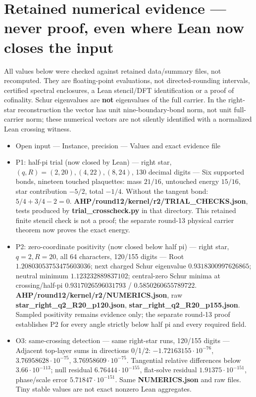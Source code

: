 \section{Retained numerical evidence — never proof, even where Lean now closes the input}

All values below were checked against retained data/summary files, not recomputed. They are floating-point evaluations, not directed-rounding intervals, certified spectral enclosures, a Lean stencil/DFT identification or a proof of cofinality. Schur eigenvalues are \textbf{not} eigenvalues of the full carrier. In the right-star reconstruction the vector has unit nine-boundary-bond norm, not unit full-carrier norm; these numerical vectors are not silently identified with a normalized Lean crossing witness.

\begin{itemize}
\item  Open input  ---  Instance, precision  ---  Values and exact evidence file 
\item  P1: half-pi trial (now closed by Lean)  ---  right star, \((q,R)=(2,20),(4,22),(8,24)\), 130 decimal digits  ---  Six supported bonds, nineteen touched plaquettes: mass \(21/16\), untouched energy \(15/16\), star contribution \(-5/2\), total \(-1/4\). Without the tangent bond: \(5/4+3/4-2=0\). \textbf{AHP/round12/kernel/r2/TRIAL\_CHECKS.json}, tests produced by \textbf{trial\_crosscheck.py} in that directory. This retained finite stencil check is not a proof; the separate round-13 physical carrier theorem now proves the exact energy. 
\item  P2: zero-coordinate positivity (now closed below half pi)  ---  right star, \(q=2,R=20\), all 64 characters, 120/155 digits  ---  Root \(1.20803053753475603036\); next charged Schur eigenvalue \(0.9318300997626865\); neutral minimum \(1.123232889837102\); central-zero Schur minima at crossing/half-pi \(0.9317026596031793\) / \(0.5850260655789722\). \textbf{AHP/round12/kernel/r2/NUMERICS.json}, raw \textbf{star\_right\_q2\_R20\_p120.json}, \textbf{star\_right\_q2\_R20\_p155.json}. Sampled positivity remains evidence only; the separate round-13 proof establishes P2 for every angle strictly below half pi and every required field. 
\item  O3: same-crossing detection  ---  same right-star runs, 120/155 digits  ---  Adjacent top-layer sums in directions 0/1/2: \(-1.72163155\cdot10^{-76}\), \(3.76958628\cdot10^{-75}\), \(3.76958609\cdot10^{-75}\). Tangential relative differences below \(3.66\cdot10^{-113}\); null residual \(6.76444\cdot10^{-155}\), flat-solve residual \(1.91375\cdot10^{-151}\), phase/scale error \(5.71847\cdot10^{-151}\). Same \textbf{NUMERICS.json} and raw files. Tiny stable values are not exact nonzero Lean aggregates. 

\end{itemize}
